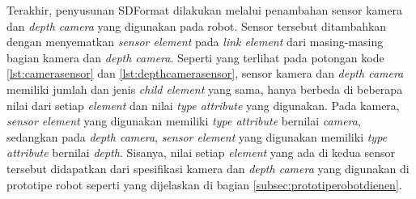 



Terakhir, penyusunan SDFormat dilakukan melalui penambahan sensor kamera dan \emph{depth camera} yang digunakan pada robot.
Sensor tersebut ditambahkan dengan menyematkan \emph{sensor element} pada \emph{link element} dari masing-masing bagian kamera dan \emph{depth camera}.
Seperti yang terlihat pada potongan kode \ref{lst:camerasensor} dan \ref{lst:depthcamerasensor},
  sensor kamera dan \emph{depth camera} memiliki jumlah dan jenis \emph{child element} yang sama,
  hanya berbeda di beberapa nilai dari setiap \emph{element} dan nilai \emph{type attribute} yang digunakan.
  Pada kamera, \emph{sensor element} yang digunakan memiliki \emph{type attribute} bernilai \emph{camera},
  sedangkan pada \emph{depth camera}, \emph{sensor element} yang digunakan memiliki \emph{type attribute} bernilai \emph{depth}.
  Sisanya, nilai setiap \emph{element} yang ada di kedua sensor tersebut didapatkan dari spesifikasi kamera dan \emph{depth camera} yang digunakan di prototipe robot seperti yang dijelaskan di bagian \ref{subsec:prototiperobotdienen}.




